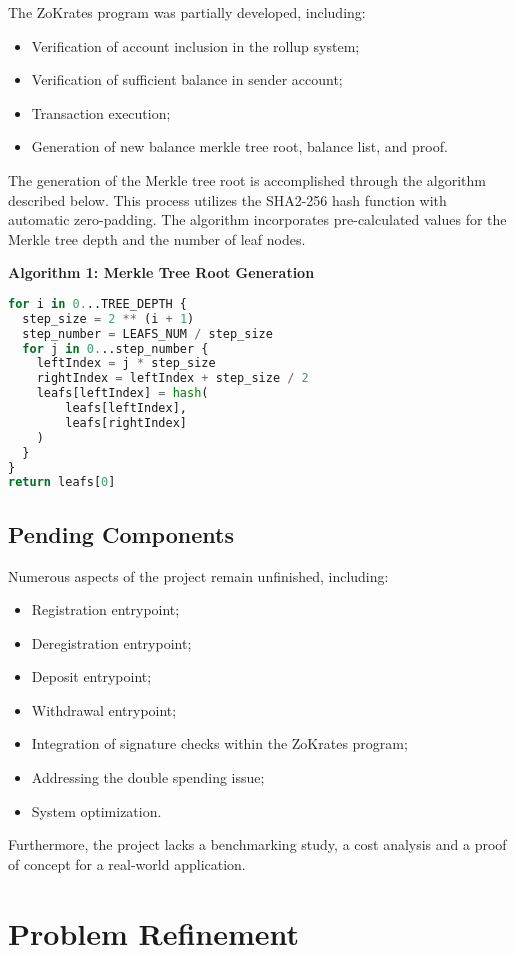 The ZoKrates program was partially developed, including:
\begin{itemize}
    \item Verification of account inclusion in the rollup system;
    \item Verification of sufficient balance in sender account;
    \item Transaction execution;
    \item Generation of new balance merkle tree root, balance list, and proof.
\end{itemize}

The generation of the Merkle tree root is accomplished through the algorithm described below. This process utilizes the SHA2-256 hash function with automatic zero-padding. The algorithm incorporates pre-calculated values for the Merkle tree depth and the number of leaf nodes.

\noindent\textbf{Algorithm 1: Merkle Tree Root Generation}
\begin{lstlisting}[language=Python]
for i in 0...TREE_DEPTH {
  step_size = 2 ** (i + 1)
  step_number = LEAFS_NUM / step_size
  for j in 0...step_number {
    leftIndex = j * step_size
    rightIndex = leftIndex + step_size / 2
    leafs[leftIndex] = hash(
        leafs[leftIndex],
        leafs[rightIndex]
    )
  }
}
return leafs[0]
\end{lstlisting}

\subsection{Pending Components\label{subsec:pendingcomponents}}
Numerous aspects of the project remain unfinished, including:
\begin{itemize}
  \item Registration entrypoint;
  \item Deregistration entrypoint;
  \item Deposit entrypoint;
  \item Withdrawal entrypoint;
  \item Integration of signature checks within the ZoKrates program;
  \item Addressing the double spending issue;
  \item System optimization.
\end{itemize}
Furthermore, the project lacks a benchmarking study, a cost analysis and a proof of concept for a real-world application.

\section{Problem Refinement\label{sec:4_problemrefinement}}

